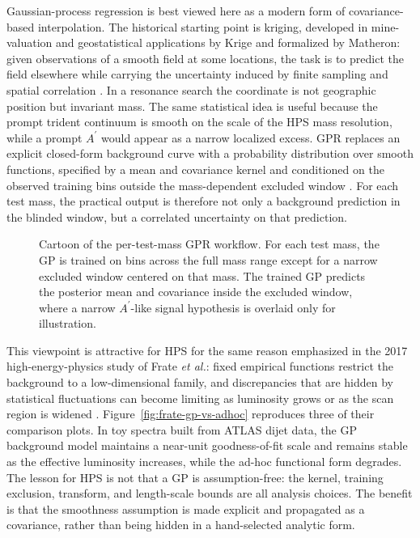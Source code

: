 Gaussian-process regression is best viewed here as a modern form of
covariance-based interpolation. The historical starting point is kriging, developed in
mine-valuation and geostatistical applications by Krige and formalized by Matheron:
given observations of a smooth field at some locations, the task is to predict the
field elsewhere while carrying the uncertainty induced by finite sampling and spatial
correlation \cite{Krige1951,Matheron1963}. In a resonance search the coordinate is not
geographic position but invariant mass. The same statistical idea is useful because
the prompt trident continuum is smooth on the scale of the HPS mass resolution, while a
prompt $A^\prime$ would appear as a narrow localized excess. GPR replaces an explicit
closed-form background curve with a probability distribution over smooth functions,
specified by a mean and covariance kernel and conditioned on the observed training
bins outside the mass-dependent excluded window \cite{RasmussenWilliams2006}. For each
test mass, the practical output is therefore not only a background prediction in the
blinded window, but a correlated uncertainty on that prediction.

\begin{figure}[H]
\centering
{}
\caption{Cartoon of the per-test-mass GPR workflow. For each test mass, the GP is
trained on bins across the full mass range except for a narrow excluded window centered
on that mass. The trained GP predicts the posterior mean and covariance inside the
excluded window, where a narrow $A^\prime$-like signal hypothesis is overlaid only for
illustration.}
\label{fig:gpr-intro-cartoon}
\end{figure}

This viewpoint is attractive for HPS for the same reason emphasized in the 2017
high-energy-physics study of Frate \textit{et al.}: fixed empirical functions restrict
the background to a low-dimensional family, and discrepancies that are hidden by
statistical fluctuations can become limiting as luminosity grows or as the scan region
is widened \cite{FrateGP2017}. Figure~\ref{fig:frate-gp-vs-adhoc} reproduces three of
their comparison plots. In toy spectra built from ATLAS dijet data, the GP background
model maintains a near-unit goodness-of-fit scale and remains stable as the effective
luminosity increases, while the ad-hoc functional form degrades. The lesson for HPS is
not that a GP is assumption-free: the kernel, training exclusion, transform, and
length-scale bounds are all analysis choices. The benefit is that the smoothness
assumption is made explicit and propagated as a covariance, rather than being hidden in
a hand-selected analytic form.

